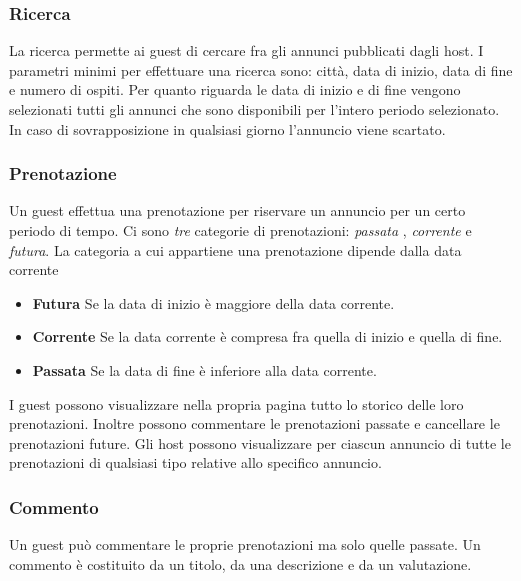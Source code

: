 \documentclass[1_relazione.tex]{subfiles}
\begin{document}
\subsubsection{Ricerca} 
La ricerca permette ai guest di cercare fra gli annunci pubblicati dagli host. I parametri minimi per effettuare una ricerca sono: città, data di inizio, data di fine e numero di ospiti. Per quanto riguarda le data di inizio e di fine vengono selezionati tutti gli annunci che sono disponibili per l'intero periodo selezionato. In caso di sovrapposizione in qualsiasi giorno l'annuncio viene scartato.

\subsubsection{Prenotazione} 
Un guest effettua una prenotazione per riservare un annuncio per un certo periodo di tempo. Ci sono \textit{tre} categorie di prenotazioni: \textit{passata} , \textit{corrente} e \textit{futura}.  La categoria a cui appartiene una prenotazione dipende dalla data corrente \\
\begin{itemize}
\item \textbf{Futura} Se la data di inizio è maggiore della data corrente.
\item \textbf{Corrente} Se la data corrente è compresa fra quella di inizio e quella di fine.
\item \textbf{Passata} Se la data di fine è inferiore alla data corrente.
\end{itemize}
I guest possono visualizzare nella propria pagina tutto lo storico delle loro prenotazioni. Inoltre possono commentare le prenotazioni passate e cancellare le prenotazioni future. 
Gli host possono visualizzare per ciascun annuncio di tutte le prenotazioni di qualsiasi tipo relative allo specifico annuncio.

\subsubsection{Commento} 
Un guest può commentare le proprie prenotazioni ma solo quelle passate. Un commento è costituito da un titolo, da una descrizione e da un valutazione. 
\end{document}
